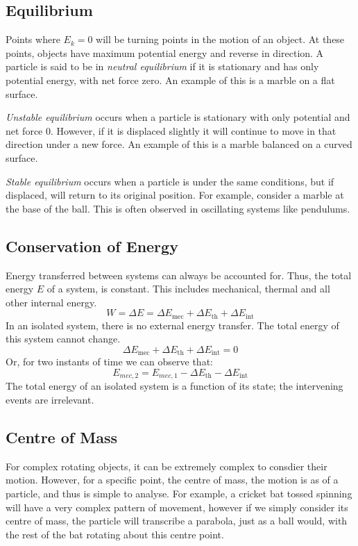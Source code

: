 \documentclass[12pt]{report}
\begin{document}
\subsection*{Equilibrium}
Points where \(E_k = 0\) will be turning points in the motion of an object. At these
points, objects have maximum potential energy and reverse in direction. A particle is
said to be in \textit{neutral equilibrium} if it is stationary and has only potential energy,
with net force zero. An example of this is a marble on a flat surface.

\bigskip
\textit{Unstable equilibrium} occurs when a particle is stationary with only 
potential and net force \(0\). However, if it is displaced slightly it will continue 
to move in that direction under a new force. An example of this is a marble balanced on
a curved surface.

\bigskip
\textit{Stable equilibrium} occurs when a particle is under the same conditions, but if 
displaced, will return to its original position. For example, consider a marble at the base
of the ball. This is often observed in oscillating systems like pendulums.

\subsection*{Conservation of Energy}
Energy transferred between systems can always be accounted for. Thus, the total energy \(E\)
of a system, is constant. This includes mechanical, thermal and all other internal energy.
\[W = \Delta E = \Delta E_\mathrm{mec} + \Delta E_\mathrm{th} + \Delta E_\mathrm{int}\]
In an isolated system, there is no external energy transfer. The total energy of this system
cannot change.
\[\Delta E_\mathrm{mec} + \Delta E_\mathrm{th} + \Delta E_\mathrm{int} = 0\]
Or, for two instants of time we can observe that:
\[E_{mec,2} = E_{mec,1} - \Delta E_\mathrm{th} - \Delta E_\mathrm{int}\]
The total energy of an isolated system is a function of its state; the intervening
events are irrelevant.

\subsection*{Centre of Mass}
For complex rotating objects, it can be extremely complex to consdier their motion.
However, for a specific point, the centre of mass, the motion is as of a particle, and
thus is simple to analyse. For example, a cricket bat tossed spinning will have a very
complex pattern of movement, however if we simply consider its centre of mass, the
particle will transcribe a parabola, just as a ball would, with the rest of the bat
rotating about this centre point.
\end{document}
